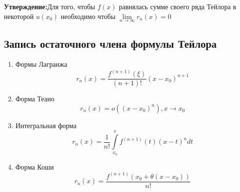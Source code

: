 \documentclass[12pt]{article}
\let\oldint\int
\let\oldlim\lim
\renewcommand{\int}{\oldint\limits}
\renewcommand{\lim}{\oldlim\limits}
\begin{document}
    \textbf{Утверждение:}Для того, чтобы $f(x)$ равнялась сумме своего ряда Тейлора в некоторой
    $u(x_0)$ необходимо чтобы $\lim_{n \to \infty}r_n(x)=0$

    \subsection*{Запись остаточного члена формулы Тейлора}
    \begin{enumerate}
      \item Формы Лагранжа
      \[r_n(x)=\frac{f^{(n+1)}(\xi)}{(n+1)!}(x-x_0)^{n+1}\]
      \item Форма Теано
      \[r_n(x)=o((x-x_0)^n), x \to x_0\]
      \item Интегральная форма
      \[r_n(x)=\frac{1}{n!}\int_{x_0}^{x}f^{(n+1)}(t)(x-t)^ndt\]
      \item Форма Коши
      \[r_n(x)=\frac{f^{(n+1)}(x_0+\theta(x-x_0))}{n!}\]
    \end{enumerate}
\end{document}
